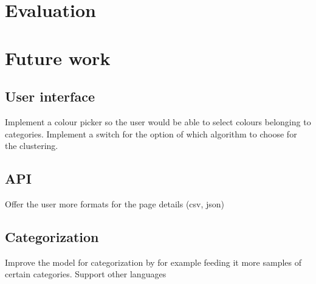 \section{Evaluation}

\section{Future work}
\subsection{User interface}
Implement a colour picker so the user would be able to select colours belonging to categories. 
Implement a switch for the option of which algorithm to choose for the clustering.
\subsection{API}
Offer the user more formats for the page details (csv, json)
\subsection{Categorization}
Improve the model for categorization by for example feeding it more samples of certain categories. 
Support other languages
